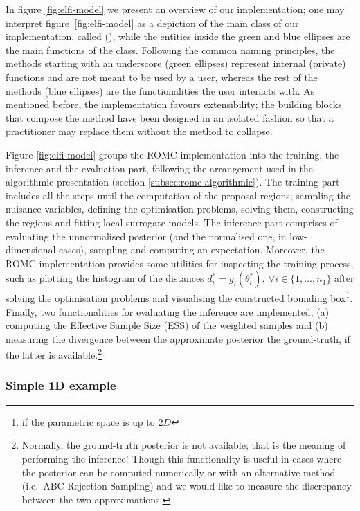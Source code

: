 In figure \ref{fig:elfi-model} we present an overview of our
implementation; one may interpret figure~\ref{fig:elfi-model} as a
depiction of the main class of our implementation, called
(), while the entities inside the green and blue
ellipses are the main functions of the class. Following the common
naming principles, the methods starting with an underscore (green
ellipses) represent internal (private) functions and are not meant to
be used by a user, whereas the rest of the methods (blue ellipses) are
the functionalities the user interacts with. As mentioned before, the
implementation favours extensibility; the building blocks that compose
the method have been designed in an isolated fashion so that a
practitioner may replace them without the method to collapse.

Figure \ref{fig:elfi-model} groups the ROMC implementation into the
training, the inference and the evaluation part, following the
arrangement used in the algorithmic presentation (section
\ref{subsec:romc-algorithmic}). The training part includes all the
steps until the computation of the proposal regions; sampling the
nuisance variables, defining the optimisation problems, solving them,
constructing the regions and fitting local surrogate models. The
inference part comprises of evaluating the unnormalised posterior (and
the normalised one, in low-dimensional cases), sampling and computing
an expectation. Moreover, the ROMC implementation provides some
utilities for inspecting the training process, such as plotting the
histogram of the distances
$d^*_i = g_i(\theta_i^*), \: \forall i \in \{1, \ldots, n_1 \}$ after
solving the optimisation problems and visualising the constructed
bounding box\footnote{if the parametric space is up to $2D$}. Finally,
two functionalities for evaluating the inference are implemented; (a)
computing the Effective Sample Size (ESS) of the weighted samples and
(b) measuring the divergence between the approximate posterior the
ground-truth, if the latter is available.\footnote{Normally, the
  ground-truth posterior is not available; that is the meaning of
  performing the inference!  Though this functionality is useful in
  cases where the posterior can be computed numerically or with an
  alternative method (i.e.\ ABC Rejection Sampling) and we would like
  to measure the discrepancy between the two approximations.}


\subsubsection*{Simple 1D example}

